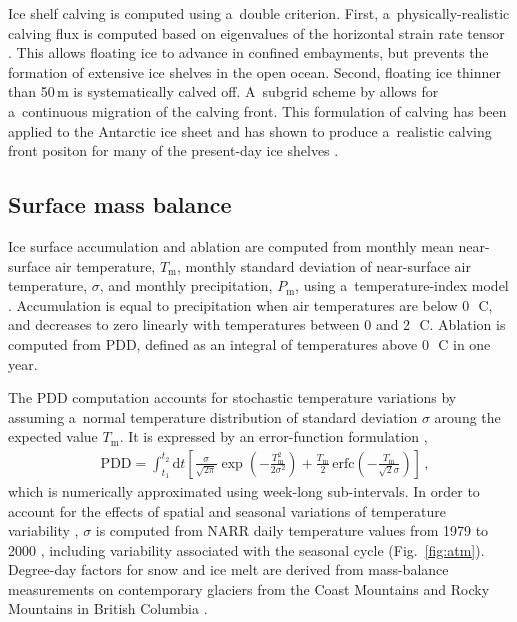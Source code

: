 \documentclass[tc, manuscript]{copernicus}
\begin{document}
      Ice shelf calving is computed using a~double criterion. First,
      a~physically-realistic calving flux is computed based on eigenvalues of
      the horizontal strain rate tensor \citep{Winkelmann.etal.2011,
      Levermann.etal.2012}. This allows floating ice to advance in confined
      embayments, but prevents the formation of extensive ice shelves in the
      open ocean. Second, floating ice thinner than 50\,\unit{m} is
      systematically calved off. A~subgrid scheme by
      \citet{Albrecht.etal.2011} allows for a~continuous migration of the
      calving front. This formulation of calving has been applied to the
      Antarctic ice sheet and has shown to produce a~realistic calving front
      positon for many of the present-day ice shelves
      \citep{Martin.etal.2011}.

\subsection{Surface mass balance}
\label{sec:surface}

      Ice surface accumulation and ablation are computed from monthly mean
      near-surface air temperature, $T_{\mathrm{m}}$, monthly standard deviation of
      near-surface air temperature, $\sigma$, and monthly precipitation,
      $P_{\mathrm{m}}$, using a~temperature-index model \citep[e.g.,][]{Hock.2003}.
      Accumulation is equal to precipitation when air temperatures are below
      0\,\unit{{\degree}C}, and decreases to zero linearly with temperatures
      between 0 and 2\,\unit{{\degree}C}. Ablation is computed from PDD,
      defined as an integral of temperatures above 0\,\unit{{\degree}C} in
      one year.

      The PDD computation accounts for stochastic temperature variations by
      assuming a~normal temperature distribution of standard deviation
      $\sigma$ aroung the expected value $T_{\mathrm{m}}$. It is expressed by an
      error-function formulation \citep{Calov.Greve.2005},
\begin{align}
&\label{eqn:calovgreve}
    {\text{PDD}} = \int_{t_1}^{t_2} \mathrm{d}t
        \left[\frac{\sigma}{\sqrt{2\pi}}
                \exp\left({-\frac{T_{\mathrm{m}}^2}{2\sigma^2}}\right)
              + \frac{T_{\mathrm{m}}}{2} \, {\text{erfc}}
                \left(-\frac{T_{\mathrm{m}}}{\sqrt{2}\sigma}\right)\right] \,,
\end{align}
      which is numerically approximated using week-long sub-intervals. In
      order to account for the effects of spatial and seasonal variations of
      temperature variability \citep{Seguinot.2013}, $\sigma$ is computed
      from NARR daily temperature values from 1979 to 2000
      \citep{Mesinger.etal.2006}, including variability associated with the
      seasonal cycle (Fig.~\ref{fig:atm}). Degree-day factors for snow and
      ice melt are derived from mass-balance measurements on contemporary
      glaciers from the Coast Mountains and Rocky Mountains in British
      Columbia \citep[Table~\ref{tab:params};][]{Shea.etal.2009}.
\end{document}
